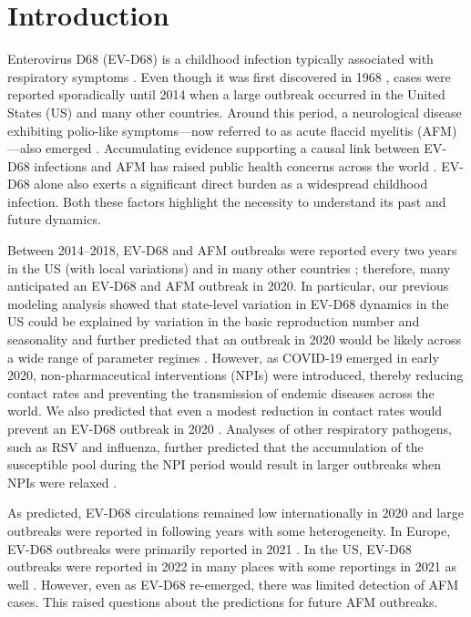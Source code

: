 \documentclass[12pt]{article}
\begin{document}
\pagebreak

\section{Introduction}

Enterovirus D68 (EV-D68) is a childhood infection typically associated with respiratory symptoms \citep{oberste2004enterovirus}.
Even though it was first discovered in 1968 \citep{schieble1967probable}, cases were reported sporadically until 2014 when a large outbreak occurred in the United States (US) \citep{messacar20162014} and many other countries.
Around this period, a neurological disease exhibiting polio-like symptoms---now referred to as acute flaccid myelitis (AFM)---also emerged \citep{roux2014polio, mckay2018increase}.
Accumulating evidence supporting a causal link between EV-D68 infections and AFM has raised public health concerns across the world \citep{dyda2018association,messacar2018enterovirus,park2021epidemiological,vogt2022enterovirus,aguglia2023contemporary}.
EV-D68 alone also exerts a significant direct burden as a widespread childhood infection.
Both these factors highlight the necessity to understand its past and future dynamics.

Between 2014--2018, EV-D68 and AFM outbreaks were reported every two years in the US (with local variations) and in many other countries \citep{messacar2019continued};
therefore, many anticipated an EV-D68 and AFM outbreak in 2020.
In particular, our previous modeling analysis showed that state-level variation in EV-D68 dynamics in the US could be explained by variation in the basic reproduction number and seasonality and further predicted that an outbreak in 2020 would be likely across a wide range of parameter regimes \citep{park2021epidemiological}.
However, as COVID-19 emerged in early 2020, non-pharmaceutical interventions (NPIs) were introduced, thereby reducing contact rates and preventing the transmission of endemic diseases across the world.
We also predicted that even a modest reduction in contact rates would prevent an EV-D68 outbreak in 2020 \citep{park2021epidemiological}.
Analyses of other respiratory pathogens, such as RSV and influenza, further predicted that the accumulation of the susceptible pool during the NPI period would result in larger outbreaks when NPIs were relaxed \citep{baker2020impact}.

As predicted, EV-D68 circulations remained low internationally in 2020 and large outbreaks were reported in following years with some heterogeneity.
In Europe, EV-D68 outbreaks were primarily reported in 2021 \citep{benschop2021re,andres2022enterovirus}.
In the US, EV-D68 outbreaks were reported in 2022 in many places \citep{ma2022increase} with some reportings in 2021 as well \citep{fall2022circulation}.
However, even as EV-D68 re-emerged, there was limited detection of AFM cases.
This raised questions about the predictions for future AFM outbreaks.
\end{document}
